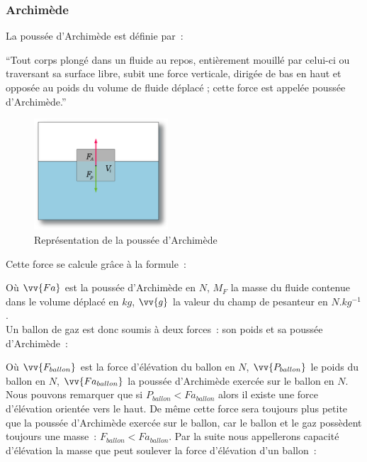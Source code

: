 \documentclass[a4paper,11pt]{article}
\begin{document}
\subsubsection{Archimède}

La poussée d'Archimède est définie par~:

\enquote{Tout corps plongé dans un fluide au repos, entièrement mouillé par celui-ci ou traversant sa surface libre, subit une force verticale, dirigée de bas en haut et opposée au poids du volume de fluide déplacé ; cette force est appelée poussée d'Archimède.}

\begin{figure}[H]
	\centering
	\includegraphics[width=5cm]{../Images/pousse_archimede.png}
	\caption{Représentation de la poussée d'Archimède}
\end{figure}

Cette force se calcule grâce à la formule~:

\begin{center}
\end{center}

Où $\vv{Fa}$ est la poussée d'Archimède en $N$, $M_F$ la masse du fluide contenue dans le volume déplacé en $kg$, $\vv{g}$ la valeur du champ de pesanteur en $N.kg^{-1}$. \\

Un ballon de gaz est donc soumis à deux forces~: son poids et sa poussée d'Archimède~:

\begin{center}
\end{center}

Où $\vv{F_{ballon}}$ est la force d'élévation du ballon en $N$, $\vv{P_{ballon}}$ le poids du ballon en $N$, $\vv{Fa_{ballon}}$ la poussée d'Archimède exercée sur le ballon en $N$. \\

Nous pouvons remarquer que si $P_{ballon} < Fa_{ballon}$ alors il existe une force d'élévation orientée vers le haut. De même cette force sera toujours plus petite que la poussée d'Archimède exercée sur le ballon, car le ballon et le gaz possèdent toujours une masse~: $F_{ballon} < Fa_{ballon}$.
Par la suite nous appellerons capacité d'élévation la masse que peut soulever la force d'élévation d'un ballon~:
\begin{center}
\end{center}
\end{document}
